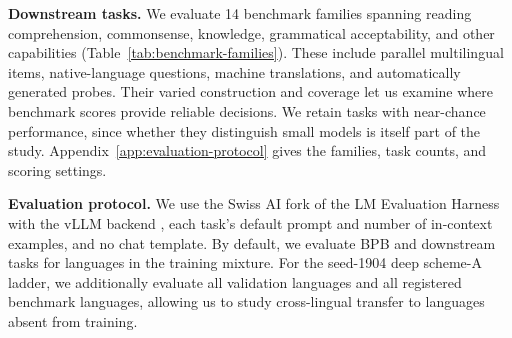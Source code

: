 \textbf{Downstream tasks.} We evaluate 14 benchmark families spanning reading comprehension, commonsense, knowledge, grammatical acceptability, and other capabilities (Table~\ref{tab:benchmark-families}). These include parallel multilingual items, native-language questions, machine translations, and automatically generated probes. Their varied construction and coverage let us examine where benchmark scores provide reliable decisions. We retain tasks with near-chance performance, since whether they distinguish small models is itself part of the study. Appendix~\ref{app:evaluation-protocol} gives the families, task counts, and scoring settings.

\textbf{Evaluation protocol.} We use the Swiss AI fork of the LM Evaluation Harness \citep{gao_framework_2024} with the vLLM backend \citep{kwon_efficient_2023}, each task's default prompt and number of in-context examples, and no chat template. By default, we evaluate BPB and downstream tasks for languages in the training mixture. For the seed-1904 deep scheme-A ladder, we additionally evaluate all validation languages and all registered benchmark languages, allowing us to study cross-lingual transfer to languages absent from training.
